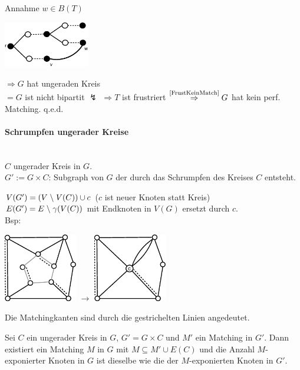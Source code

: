 Annahme $w \in B(T)$

\includegraphics[height=2cm]{bilder/5-2BewL5-3}

$\Rightarrow G$ hat ungeraden Kreis\\
$=G$ ist nicht bipartit $\lightning$ 
$\Rightarrow T$ ist frustriert $\stackrel{\mbox{\scriptsize
\ref{FrustKeinMatch}}}{\Rightarrow}G$ hat kein perf. Matching. q.e.d.

\paragraph{Schrumpfen ungerader Kreise}\mbox{}\\
$C$ ungerader Kreis in $G$.\\
$G':= G \times C$: Subgraph von $G$ der durch das Schrumpfen des Kreises
$C$ entsteht.

$V(G') =(V\;\backslash\; V(C)) \cup c$ ($c$ ist neuer Knoten statt Kreis)\\
$E(G') = E \;\backslash\; \gamma(V(C))$ mit Endknoten in $V(G)$ ersetzt durch
$c$.\\
Bsp:

\includegraphics[height=3cm]{bilder/5-2Schrumpfb}
\hspace{4mm}$\rightarrow$\hspace{4mm}
\includegraphics[height=3cm]{bilder/5-2Schrumpfb2}

Die Matchingkanten sind durch die gestrichelten Linien angedeutet.

\begin{lemma}
Sei $C$ ein ungerader Kreis in $G$, $G' = G \times C$ und $M'$ ein Matching
in $G'$. Dann existiert ein Matching $M$ in $G$ mit $M\subseteq M' \cup
E(C)$ und die Anzahl $M$-exponierter Knoten in $G$ ist dieselbe wie die
der $M$-exponierten Knoten in $G'$.
\end{lemma}

